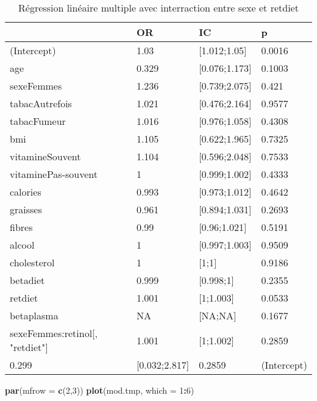 \documentclass[]{article}
\newenvironment{Shaded}{\begin{snugshade}}{\end{snugshade}}
\newcommand{\KeywordTok}[1]{\textcolor[rgb]{0.13,0.29,0.53}{\textbf{#1}}}
\newcommand{\DataTypeTok}[1]{\textcolor[rgb]{0.13,0.29,0.53}{#1}}
\newcommand{\DecValTok}[1]{\textcolor[rgb]{0.00,0.00,0.81}{#1}}
\newcommand{\OperatorTok}[1]{\textcolor[rgb]{0.81,0.36,0.00}{\textbf{#1}}}
\newcommand{\NormalTok}[1]{#1}
\begin{document}
\begin{table}

\caption{\label{tab:unnamed-chunk-84}Régression linéaire multiple avec interraction entre sexe et retdiet}
\centering
\begin{tabular}[t]{l|l|l|l}
\hline
  & OR & IC & p\\
\hline
\rowcolor[HTML]{BBD2E1}  (Intercept) & 1.03 & [1.012;1.05] & 0.0016\\
\hline
age & 0.329 & [0.076;1.173] & 0.1003\\
\hline
\rowcolor[HTML]{BBD2E1}  sexeFemmes & 1.236 & [0.739;2.075] & 0.421\\
\hline
tabacAutrefois & 1.021 & [0.476;2.164] & 0.9577\\
\hline
\rowcolor[HTML]{BBD2E1}  tabacFumeur & 1.016 & [0.976;1.058] & 0.4308\\
\hline
bmi & 1.105 & [0.622;1.965] & 0.7325\\
\hline
\rowcolor[HTML]{BBD2E1}  vitamineSouvent & 1.104 & [0.596;2.048] & 0.7533\\
\hline
vitaminePas-souvent & 1 & [0.999;1.002] & 0.4333\\
\hline
\rowcolor[HTML]{BBD2E1}  calories & 0.993 & [0.973;1.012] & 0.4642\\
\hline
graisses & 0.961 & [0.894;1.031] & 0.2693\\
\hline
\rowcolor[HTML]{BBD2E1}  fibres & 0.99 & [0.96;1.021] & 0.5191\\
\hline
alcool & 1 & [0.997;1.003] & 0.9509\\
\hline
\rowcolor[HTML]{BBD2E1}  cholesterol & 1 & [1;1] & 0.9186\\
\hline
betadiet & 0.999 & [0.998;1] & 0.2355\\
\hline
\rowcolor[HTML]{BBD2E1}  retdiet & 1.001 & [1;1.003] & 0.0533\\
\hline
betaplasma & NA & [NA;NA] & 0.1677\\
\hline
\rowcolor[HTML]{BBD2E1}  sexeFemmes:retinol[, "retdiet"] & 1.001 & [1;1.002] & 0.2859\\
\hline
0.299 & [0.032;2.817] & 0.2859 & (Intercept)\\
\hline
\end{tabular}
\end{table}

\begin{Shaded}
\begin{Highlighting}[]
\KeywordTok{par}\NormalTok{(}\DataTypeTok{mfrow =} \KeywordTok{c}\NormalTok{(}\DecValTok{2}\NormalTok{,}\DecValTok{3}\NormalTok{))}
\KeywordTok{plot}\NormalTok{(mod.tmp, }\DataTypeTok{which =} \DecValTok{1}\OperatorTok{:}\DecValTok{6}\NormalTok{)}
\end{Highlighting}
\end{Shaded}
\end{document}
